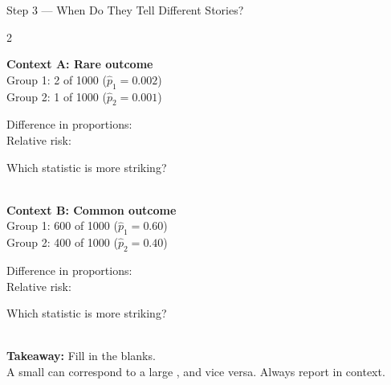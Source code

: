 \documentclass[10pt]{article}
\begin{document}
\begin{notesbox}{Step 3 --- When Do They Tell Different Stories?}
\small
\begin{multicols}{2}

\textbf{Context A: Rare outcome}\\
Group 1: 2 of 1000 ($\hat{p}_1 = 0.002$)\\
Group 2: 1 of 1000 ($\hat{p}_2 = 0.001$)

\vspace{4pt}
Difference in proportions: \blank{3cm}\\
Relative risk: \blank{3cm}

\vspace{6pt}
Which statistic is more striking?\\
\writeline\\[1pt]\writeline

\columnbreak

\textbf{Context B: Common outcome}\\
Group 1: 600 of 1000 ($\hat{p}_1 = 0.60$)\\
Group 2: 400 of 1000 ($\hat{p}_2 = 0.40$)

\vspace{4pt}
Difference in proportions: \blank{3cm}\\
Relative risk: \blank{3cm}

\vspace{6pt}
Which statistic is more striking?\\
\writeline\\[1pt]\writeline

\end{multicols}

\vspace{4pt}
\textbf{Takeaway:} Fill in the blanks.\\
A small \blank{3cm} can correspond to a large \blank{3cm}, and vice versa.
Always report \blank{5cm} in context.
\end{notesbox}

\vspace{0.1in}
\end{document}
